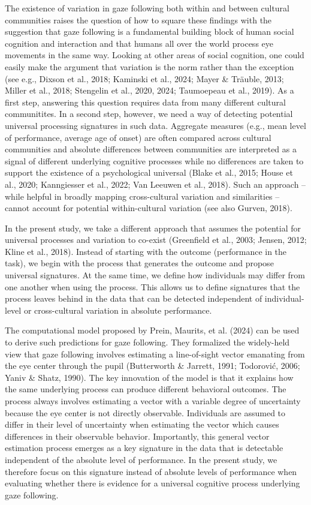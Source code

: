 \documentclass[
  man,floatsintext]{apa7}
\begin{document}
The existence of variation in gaze following both within and between cultural communities raises the question of how to square these findings with the suggestion that gaze following is a fundamental building block of human social cognition and interaction and that humans all over the world process eye movements in the same way. Looking at other areas of social cognition, one could easily make the argument that variation is the norm rather than the exception (see e.g., Dixson et al., 2018; Kaminski et al., 2024; Mayer \& Träuble, 2013; Miller et al., 2018; Stengelin et al., 2020, 2024; Taumoepeau et al., 2019). As a first step, answering this question requires data from many different cultural communitites. In a second step, however, we need a way of detecting potential universal processing signatures in such data. Aggregate measures (e.g., mean level of performance, average age of onset) are often compared across cultural communities and absolute differences between communities are interpreted as a signal of different underlying cognitive processes while no differences are taken to support the existence of a psychological universal (Blake et al., 2015; House et al., 2020; Kanngiesser et al., 2022; Van Leeuwen et al., 2018). Such an approach -- while helpful in broadly mapping cross-cultural variation and similarities -- cannot account for potential within-cultural variation (see also Gurven, 2018).

In the present study, we take a different approach that assumes the potential for universal processes and variation to co-exist (Greenfield et al., 2003; Jensen, 2012; Kline et al., 2018). Instead of starting with the outcome (performance in the task), we begin with the process that generates the outcome and propose universal signatures. At the same time, we define how individuals may differ from one another when using the process. This allows us to define signatures that the process leaves behind in the data that can be detected independent of individual-level or cross-cultural variation in absolute performance.

The computational model proposed by Prein, Maurits, et al. (2024) can be used to derive such predictions for gaze following. They formalized the widely-held view that gaze following involves estimating a line-of-sight vector emanating from the eye center through the pupil (Butterworth \& Jarrett, 1991; Todorović, 2006; Yaniv \& Shatz, 1990). The key innovation of the model is that it explains how the same underlying process can produce different behavioral outcomes. The process always involves estimating a vector with a variable degree of uncertainty because the eye center is not directly observable. Individuals are assumed to differ in their level of uncertainty when estimating the vector which causes differences in their observable behavior. Importantly, this general vector estimation process emerges as a key signature in the data that is detectable independent of the absolute level of performance. In the present study, we therefore focus on this signature instead of absolute levels of performance when evaluating whether there is evidence for a universal cognitive process underlying gaze following.
\end{document}
